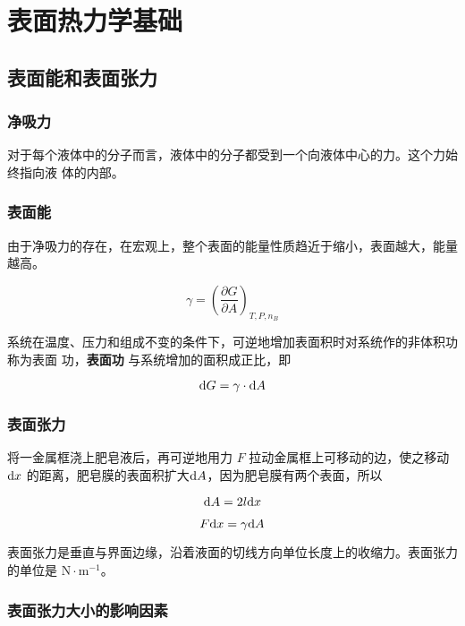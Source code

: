 \chapter{表面热力学基础}
\section{表面能和表面张力}
\subsection{净吸力}

对于每个液体中的分子而言，液体中的分子都受到一个向液体中心的力。这个力始终指向液
体的内部。

\subsection{表面能}

由于净吸力的存在，在宏观上，整个表面的能量性质趋近于缩小，表面越大，能量越高。

\begin{equation}
    \gamma = \left(\frac{\partial G}{\partial A}\right)_{T, P, n_B}
\end{equation}

系统在温度、压力和组成不变的条件下，可逆地增加表面积时对系统作的非体积功称为表面
功，\textbf{表面功} 与系统增加的面积成正比，即

\begin{equation}
    \mathrm{d} G = \gamma \cdot \mathrm{d} A
\end{equation}


\subsection{表面张力}

将一金属框浇上肥皂液后，再可逆地用力 $F$ 拉动金属框上可移动的边，使之移动 $\mathrm{d} x$
的距离，肥皂膜的表面积扩大$\mathrm{d} A$，因为肥皂膜有两个表面，所以

\begin{equation}
    \mathrm{d} A = 2 l \mathrm{d} x
\end{equation}


\begin{equation}
    F \mathrm{d} x = \gamma \mathrm{d} A
\end{equation}

表面张力是垂直与界面边缘，沿着液面的切线方向单位长度上的收缩力。表面张力的单位是
$\mathrm{N \cdot m^{-1}}$。


\subsection{表面张力大小的影响因素}


